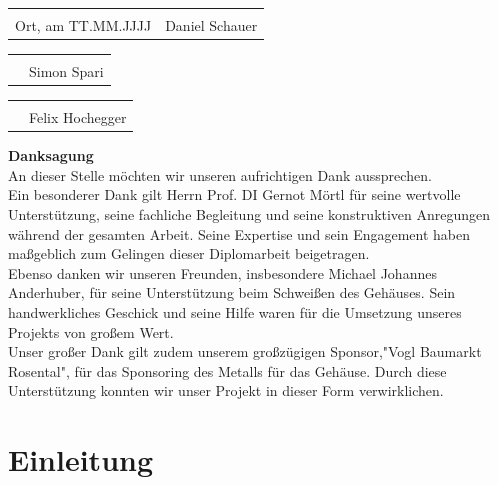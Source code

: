 \documentclass[ngerman,12pt,a4paper]{article}
\begin{document}
	\noindent
	\begin{tabular}{p{7cm} p{7cm}}
		\hrulefill & \hrulefill \\
		Ort, am TT.MM.JJJJ & Daniel Schauer \\
	\end{tabular}
	
	\vspace{2cm}
	
	\noindent
	\begin{tabular}{p{7cm} p{7cm}}
		& \hrulefill \\
		& Simon Spari \\
	\end{tabular}

	\vspace{2cm}
	\noindent
	\begin{tabular}{p{7cm} p{7cm}}
		& \hrulefill \\
		& Felix Hochegger \\
	\end{tabular}
	\newpage
	\textbf{\Huge Danksagung}\\[0.5 cm]
	An dieser Stelle möchten wir unseren aufrichtigen Dank aussprechen.\\[0.5 cm]
	Ein besonderer Dank gilt Herrn Prof. DI Gernot Mörtl für seine wertvolle Unterstützung, seine fachliche Begleitung und seine konstruktiven Anregungen während der gesamten Arbeit. Seine Expertise und sein Engagement haben maßgeblich zum Gelingen dieser Diplomarbeit beigetragen.\\[0.5 cm]
	Ebenso danken wir unseren Freunden, insbesondere Michael Johannes Anderhuber, für seine Unterstützung beim Schweißen des Gehäuses. Sein handwerkliches Geschick und seine Hilfe waren für die Umsetzung unseres Projekts von großem Wert.\\[0.5 cm]
	Unser großer Dank gilt zudem unserem großzügigen Sponsor,"Vogl Baumarkt Rosental", für das Sponsoring des Metalls für das Gehäuse. Durch diese Unterstützung konnten wir unser Projekt in dieser Form verwirklichen.
	\newpage
	\tableofcontents
	\newpage
	\section{Einleitung}
\end{document}

